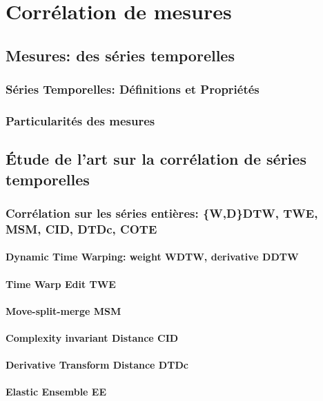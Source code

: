 \documentclass[onecolumn, 12pt]{book}
\begin{document}
\chapter{Corr\'elation de mesures}
	\section{Mesures: des s\'eries temporelles}
		\subsection{S\'eries Temporelles: D\'efinitions et Propri\'et\'es}
		\subsection{Particularit\'es des mesures}
	\section{\'Etude de l'art sur la corr\'elation de s\'eries temporelles}
		\subsection{Corr\'elation sur les s\'eries enti\`eres: \{W,D\}DTW, TWE, MSM, CID, DTDc, COTE}
			\subsubsection{Dynamic Time Warping: weight WDTW, derivative DDTW }
			\subsubsection{Time Warp Edit TWE}
			\subsubsection{Move-split-merge MSM}
			\subsubsection{Complexity invariant Distance CID}
			\subsubsection{Derivative Transform Distance DTDc}
			\subsubsection{Elastic Ensemble EE}
\end{document}
